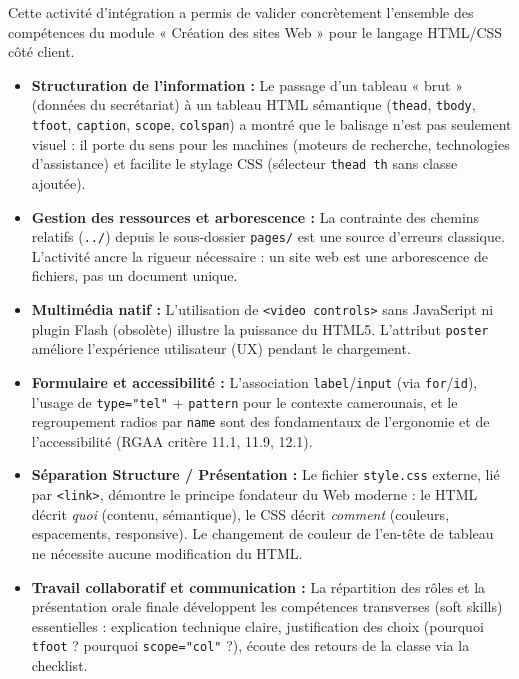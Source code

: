 \documentclass[11pt]{article}
\newcounter{popsec}
\newcounter{popsub}
\newcommand{\courssub}[1]{%
  \stepcounter{popsub}%
  \par\vspace{9pt}\noindent{\popxbold\fontsize{11.5}{13}\selectfont\color{popink}{\color{poporange}\thepopsec.\thepopsub}\hspace{6pt}#1}\par\nopagebreak\vspace{4pt}
}
\begin{document}
\courssub{Bilan de l'activité}
Cette activité d'intégration a permis de valider concrètement l'ensemble des compétences du module « Création des sites Web » pour le langage HTML/CSS côté client.

\begin{itemize}
    \item \textbf{Structuration de l'information :} Le passage d'un tableau « brut » (données du secrétariat) à un tableau HTML sémantique (\texttt{thead}, \texttt{tbody}, \texttt{tfoot}, \texttt{caption}, \texttt{scope}, \texttt{colspan}) a montré que le balisage n'est pas seulement visuel : il porte du sens pour les machines (moteurs de recherche, technologies d'assistance) et facilite le stylage CSS (sélecteur \texttt{thead th} sans classe ajoutée).
    \item \textbf{Gestion des ressources et arborescence :} La contrainte des chemins relatifs (\texttt{../}) depuis le sous-dossier \texttt{pages/} est une source d'erreurs classique. L'activité ancre la rigueur nécessaire : un site web est une arborescence de fichiers, pas un document unique.
    \item \textbf{Multimédia natif :} L'utilisation de \texttt{<video controls>} sans JavaScript ni plugin Flash (obsolète) illustre la puissance du HTML5. L'attribut \texttt{poster} améliore l'expérience utilisateur (UX) pendant le chargement.
    \item \textbf{Formulaire et accessibilité :} L'association \texttt{label}/\texttt{input} (via \texttt{for}/\texttt{id}), l'usage de \texttt{type="tel"} + \texttt{pattern} pour le contexte camerounais, et le regroupement radios par \texttt{name} sont des fondamentaux de l'ergonomie et de l'accessibilité (RGAA critère 11.1, 11.9, 12.1).
    \item \textbf{Séparation Structure / Présentation :} Le fichier \texttt{style.css} externe, lié par \texttt{<link>}, démontre le principe fondateur du Web moderne : le HTML décrit \emph{quoi} (contenu, sémantique), le CSS décrit \emph{comment} (couleurs, espacements, responsive). Le changement de couleur de l'en-tête de tableau ne nécessite aucune modification du HTML.
    \item \textbf{Travail collaboratif et communication :} La répartition des rôles et la présentation orale finale développent les compétences transverses (soft skills) essentielles : explication technique claire, justification des choix (pourquoi \texttt{tfoot} ? pourquoi \texttt{scope="col"} ?), écoute des retours de la classe via la checklist.
\end{itemize}
\end{document}

